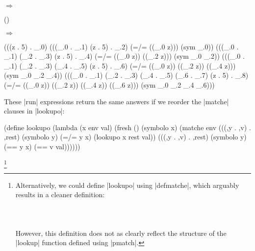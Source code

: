 \noindent{} $\Rightarrow$
\begin{schemeresponsebox}()\end{schemeresponsebox}

\noindent{}

$\Rightarrow$

\begin{schemeresponsebox}
(((z . 5) . _.0)
 (((_.0 . _.1) (z . 5) . _.2)
  (=/= ((_.0 z))) (sym _.0))
 (((_.0 . _.1) (_.2 . _.3) (z . 5) . _.4)
  (=/= ((_.0 z)) ((_.2 z))) (sym _.0 _.2))
 (((_.0 . _.1) (_.2 . _.3) (_.4 . _.5) (z . 5) . _.6)
  (=/= ((_.0 z)) ((_.2 z)) ((_.4 z))) (sym _.0 _.2 _.4))
 (((_.0 . _.1) (_.2 . _.3) (_.4 . _.5) (_.6 . _.7) (z . 5) . _.8)
  (=/= ((_.0 z)) ((_.2 z)) ((_.4 z)) ((_.6 z))) (sym _.0 _.2 _.4 _.6)))
\end{schemeresponsebox}

These \scheme|run| expressions return the same answers if we reorder the \scheme|matche| clauses in \scheme|lookupo|:

\begin{schemedisplay}
(define lookupo
  (lambda (x env val)
    (fresh ()
      (symbolo x)
      (matche env
        (((,y . ,v) . ,rest) (symbolo y)
         (=/= y x) (lookupo x rest val))
        (((,y . ,v) . ,rest) (symbolo y)
         (== y x) (== v val))))))
\end{schemedisplay}




\setbox\boxa{}

\footnote{Alternatively, we could define \scheme|lookupo| using \scheme|defmatche|, which arguably results in a cleaner definition: \\ \ \\ \usebox{\boxa} \\ \ \\ However, this definition does not as clearly reflect the structure of the \scheme|lookup| function defined using \scheme|pmatch|.}
